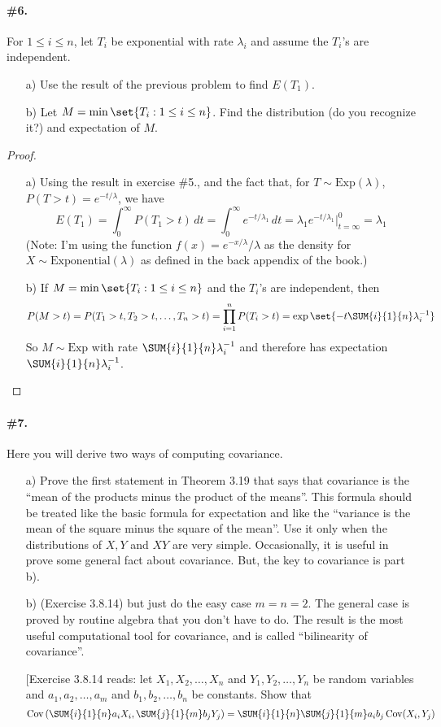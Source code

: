 \documentclass[12pt,titlepage]{article}
\DeclareMathOperator{\Cov}{Cov}
\begin{document}
\paragraph{\#6.} For $1 \leq i \leq n$, let $T_i$ be exponential with rate $\lambda_{i}$ and assume the $T_i$'s are independent. 
\begin{enumerate}
\item[a)] Use the result of the previous problem to find $E(T_1)$. 
\item[b)] Let $M = \min\set{T_i : 1 \leq i \leq n}$. Find the distribution (do you recognize it?) and expectation of $M$. 
\end{enumerate}
\begin{proof}
\begin{enumerate}
\item[a)] Using the result in exercise \#5., and the fact that, for $T \sim \text{Exp}(\lambda)$, $P(T > t) = e^{-t/\lambda }$, we have 
\[
E(T_1) = \int_{0}^{\infty} P(T_1 > t) \, dt = \int_{0}^{\infty} e^{-t/\lambda_{1}} \, dt = \lambda_{1} e^{-t/\lambda_1}\bigr|_{t=\infty}^{0} = \lambda_{1}
\]
(Note: I'm using the function $f(x) = e^{-x/\lambda}/\lambda$ as the density for $X \sim \text{Exponential}(\lambda)$ as defined in the back appendix of the book.)
\item[b)]If $M = \min\set{T_i : 1 \leq i \leq n}$ and the $T_{i}$'s are independent, then 
\[
P(M > t) = P(T_1 > t, T_2 > t, \ldots, T_n > t) = \prod_{i=1}^{n} P(T_i > t) = \exp\set{-t\SUM{i}{1}{n}\lambda_{i}^{-1}}
\]
So $M \sim \text{Exp}$ with rate $\SUM{i}{1}{n} \lambda_{i}^{-1}$ and therefore has expectation $\SUM{i}{1}{n} \lambda_{i}^{-1}$. 
\end{enumerate}
\end{proof}

\paragraph{\#7.} Here you will derive two ways of computing covariance. 
\begin{enumerate}
\item[a)] Prove the first statement in Theorem 3.19 that says that covariance is the ``mean of the products minus the product of the means''. This formula should be treated like the basic formula for expectation and like the ``variance is the mean of the square minus the square of the mean''. Use it only when the distributions of $X,Y$ and $XY$ are very simple. Occasionally, it is useful in prove some general fact about covariance. But, the key to covariance is part b). 
\item[b)] (Exercise 3.8.14) but just do the easy case $m=n=2$. The general case is proved by routine algebra that you don't have to do. The result is the most useful computational tool for covariance, and is called ``bilinearity of covariance''. 

[Exercise 3.8.14 reads: let $X_1, X_2, \ldots, X_n$ and $Y_1, Y_2, \ldots, Y_n$ be random variables and $a_1, a_2, \ldots, a_m$ and $b_1, b_2, \ldots, b_n$ be constants. Show that
\[
\Cov\left(\SUM{i}{1}{n}a_i X_i, \SUM{j}{1}{m} b_j Y_j \right) = \SUM{i}{1}{n}\SUM{j}{1}{m}a_i b_j \Cov(X_i, Y_j)
\]

\end{enumerate}
\end{document}
